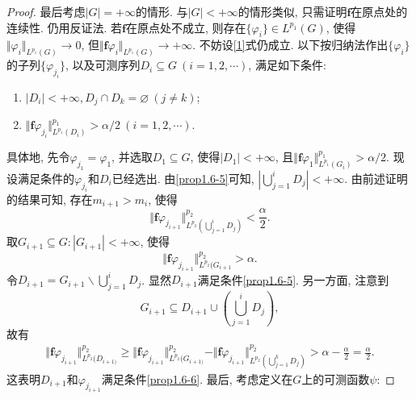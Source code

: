 \begin{proposition}
\begin{proof}
        最后考虑$|G| = +\infty$的情形. 与$|G| < +\infty$的情形类似, 只需证明$\bm{f}$在原点处的连续性. 仍用反证法. 若$\bm{f}$在原点处不成立, 则存在$\{\varphi_i\} \in L^{p_1}(G)$, 使得$\Vert \varphi_i\Vert_{L^{p_1}(G)} \rightarrow 0$, 但$\Vert \bm{f}\varphi_i\Vert_{L^{p_1}(G)} \rightarrow +\infty$. 不妨设\eqref{1}式仍成立. 以下按归纳法作出$\{\varphi_i\}$的子列$\{\varphi_{j_i}\}$, 以及可测序列$D_i \subseteq G\ (i = 1, 2, \cdots)$, 满足如下条件: 
        \begin{enumerate}[start=5]
            \item $|D_i| < +\infty, D_j \cap D_k = \varnothing\ (j \neq k)$; \label{prop1.6-5}
            \item $\Vert \bm{f}\varphi_{j_i}\Vert_{L^{p_1}(D_i)}^{p_1} > \alpha/2\ (i = 1, 2, \cdots)$. \label{prop1.6-6}
        \end{enumerate}
        具体地, 先令$\varphi_{j_1} = \varphi_1$, 并选取$D_1 \subseteq G$, 使得$|D_1| < +\infty$, 且$\Vert \bm{f}\varphi_1\Vert_{L^{p_1}(G_i)}^{p_1} > \alpha/2$. 现设满足条件的$\varphi_{j_i}$和$D_i$已经选出. 由\ref{prop1.6-5}可知, $|\bigcup_{j = 1}^iD_j| < +\infty$. 由前述证明的结果可知, 存在$m_{i + 1} > m_i$, 使得
        \begin{equation*}
            \Vert \bm{f}\varphi_{j_{i + 1}}\Vert^{p_2}_{L^{p_2}(\bigcup_{j = 1}^iD_j)} < \frac{\alpha}{2}.
        \end{equation*}
        取$G_{i + 1} \subseteq G\colon |G_{i + 1}| < +\infty$, 使得 
        \begin{equation*}
            \Vert \bm{f}\varphi_{j_{i + 1}}\Vert_{L^{p_2}(G_{i + 1}}^{p_2} > \alpha.
        \end{equation*}
        令$D_{i + 1} = G_{i + 1} \smallsetminus \bigcup_{j = 1}^iD_j$. 
        显然$D_{i + 1}$满足条件\ref{prop1.6-5}. 另一方面, 注意到 
        \begin{equation*}
            G_{i + 1} \subseteq D_{i + 1} \cup \left(\bigcup_{j = 1}^iD_j\right),
        \end{equation*}
        故有 
        \begin{align*}
            \Vert \bm{f}\varphi_{j_{i + 1}}\Vert_{L^{p_2}(D_{i + 1)}}^{p_2} \geq \Vert \bm{f}\varphi_{j_{i + 1}}\Vert_{L^{p_2}(G_{i + 1)}}^{p_2} - \Vert \bm{f}\varphi_{j_{i + 1}}\Vert_{L^{p_2}(\bigcup_{j = 1}^kD_j)}^{p_2} > \alpha - \frac{\alpha}{2} = \frac{\alpha}{2}.
        \end{align*}
        这表明$D_{i + 1}$和$\varphi_{j_{i + 1}}$满足条件\eqref{prop1.6-6}.
        最后, 考虑定义在$G$上的可测函数$\psi$:

\end{proof}
\end{proposition}
